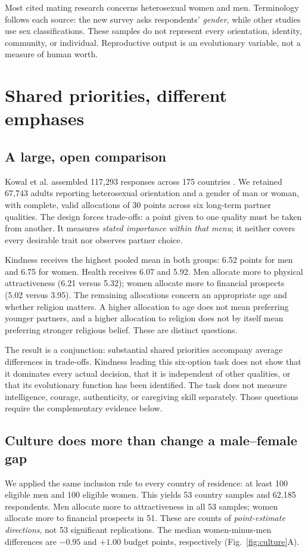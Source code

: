\documentclass[10pt,twocolumn,letterpaper]{article}
\begin{document}
Most cited mating research concerns heterosexual women and men. Terminology follows each source: the new survey asks respondents' \emph{gender}, while other studies use sex classifications. These samples do not represent every orientation, identity, community, or individual. Reproductive output is an evolutionary variable, not a measure of human worth.

\section{Shared priorities, different emphases}
\subsection{A large, open comparison}
Kowal et al. assembled 117,293 responses across 175 countries \citep{kowal2025}. We retained 67,743 adults reporting heterosexual orientation and a gender of man or woman, with complete, valid allocations of 30 points across six long-term partner qualities. The design forces trade-offs: a point given to one quality must be taken from another. It measures \emph{stated importance within that menu}; it neither covers every desirable trait nor observes partner choice.

Kindness receives the highest pooled mean in both groups: 6.52 points for men and 6.75 for women. Health receives 6.07 and 5.92. Men allocate more to physical attractiveness (6.21 versus 5.32); women allocate more to financial prospects (5.02 versus 3.95). The remaining allocations concern an appropriate age and whether religion matters. A higher allocation to age does not mean preferring younger partners, and a higher allocation to religion does not by itself mean preferring stronger religious belief. These are distinct questions.

The result is a conjunction: substantial shared priorities accompany average differences in trade-offs. Kindness leading this six-option task does not show that it dominates every actual decision, that it is independent of other qualities, or that its evolutionary function has been identified. The task does not measure intelligence, courage, authenticity, or caregiving skill separately. Those questions require the complementary evidence below.

\subsection{Culture does more than change a male--female gap}
We applied the same inclusion rule to every country of residence: at least 100 eligible men and 100 eligible women. This yields 53 country samples and 62,185 respondents. Men allocate more to attractiveness in all 53 samples; women allocate more to financial prospects in 51. These are counts of \emph{point-estimate directions}, not 53 significant replications. The median women-minus-men differences are $-0.95$ and $+1.00$ budget points, respectively (Fig.~\ref{fig:culture}A).
\end{document}
